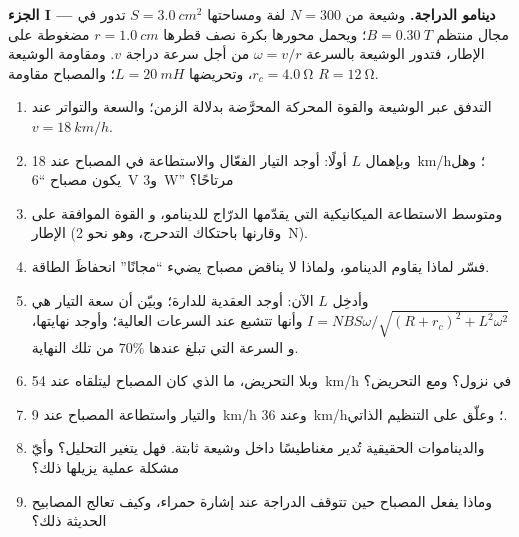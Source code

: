 \begin{problem}
\label{pb:b1:induction:1}

\medskip
\noindent\textbf{الجزء I --- دينامو الدراجة.}
وشيعة من $N = 300$ لفة ومساحتها $S = \qty{3.0}{cm^2}$ تدور في
مجال منتظم $B = \qty{0.30}{T}$؛ ويحمل محورها بكرة نصف قطرها
$r = \qty{1.0}{cm}$ مضغوطة على الإطار، فتدور الوشيعة بالسرعة
$\omega = v/r$ من أجل سرعة دراجة $v$. ومقاومة الوشيعة $r_c = \qty{4.0}{\ohm}$،
وتحريضها $L = \qty{20}{mH}$؛ والمصباح مقاومة $R = \qty{12}{\ohm}$.
\begin{enumerate}
  \item التدفق عبر الوشيعة والقوة المحركة المحرَّضة بدلالة الزمن؛
        والسعة والتواتر عند $v = \qty{18}{km/h}$.
  \item وبإهمال $L$ أولًا: أوجد التيار الفعّال والاستطاعة في المصباح عند
        \qty{18}{km/h}؛ وهل يكون مصباح ``\qty{6}{V} و\qty{3}{W}'' مرتاحًا؟
  \item ومتوسط الاستطاعة الميكانيكية التي يقدّمها الدرّاج للدينامو، و
        القوة الموافقة على الإطار (وقارنها باحتكاك التدحرج،
        وهو نحو \qty{2}{N}).
  \item فسّر  لماذا يقاوم الدينامو، ولماذا لا يناقض مصباح
        يضيء ``مجانًا'' انحفاظَ الطاقة.
  \item وأدخِل $L$ الآن: أوجد  العقدية للدارة؛ وبيّن أن
        سعة التيار هي $I = NBS\omega/\sqrt{(R + r_c)^2 + L^2\omega^2}$
        وأنها تتشبع عند السرعات العالية؛ وأوجد نهايتها، و
        السرعة التي تبلغ عندها $70\%$ من تلك النهاية.
  \item وبلا التحريض، ما الذي كان المصباح ليتلقاه عند
        \qty{54}{km/h} في نزول؟ ومع التحريض؟
  \item والتيار واستطاعة المصباح عند \qty{9}{km/h} وعند \qty{36}{km/h}؛ وعلّق
        على التنظيم الذاتي.
  \item والديناموات الحقيقية تُدير مغناطيسًا داخل وشيعة ثابتة. فهل يتغير
        التحليل؟ وأيّ مشكلة عملية يزيلها ذلك؟
  \item وماذا يفعل المصباح حين تتوقف الدراجة عند إشارة حمراء،
        وكيف تعالج المصابيح الحديثة ذلك؟
\end{enumerate}


\end{problem}
